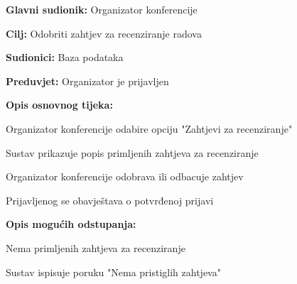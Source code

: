 	\noindent {}
	\begin{packed_item}
		
		\item \textbf{Glavni sudionik: }Organizator konferencije
		\item  \textbf{Cilj:} Odobriti zahtjev za recenziranje radova
		\item  \textbf{Sudionici:} Baza podataka
		\item  \textbf{Preduvjet:} Organizator je prijavljen
		\item  \textbf{Opis osnovnog tijeka:}
		
		\item[] \begin{packed_enum}
			
			\item Organizator konferencije odabire opciju "Zahtjevi za recenziranje"
			\item Sustav prikazuje popis primljenih zahtjeva za recenziranje
			\item Organizator konferencije odobrava ili odbacuje zahtjev
			\item Prijavljenog se obavještava o potvrđenoj prijavi
			
		\end{packed_enum}
		
		\item  \textbf{Opis mogućih odstupanja:}
		
		\item[] \begin{packed_item}
			
			\item[2.a] Nema primljenih zahtjeva za recenziranje
			\item[] \begin{packed_enum}
				
				\item Sustav ispisuje poruku "Nema pristiglih zahtjeva"
				
			\end{packed_enum}
		\end{packed_item}
	\end{packed_item}

